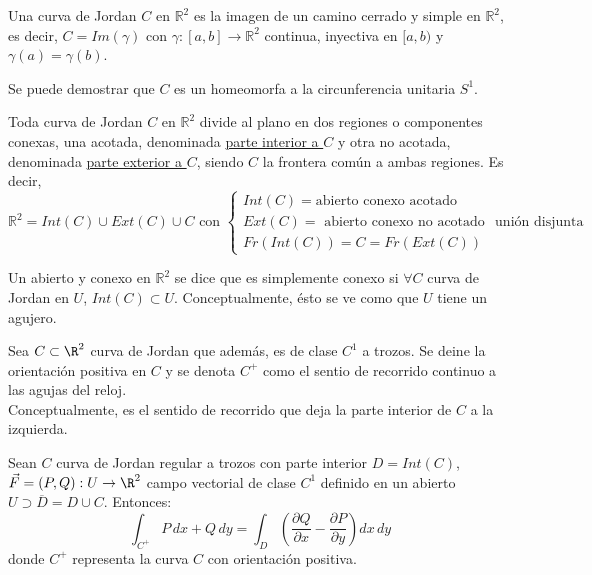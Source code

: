 \begin{definición}
Una curva de Jordan $C$ en $\mathbb{R}^2$ es la imagen de un camino cerrado y simple en $\mathbb{R}^2$, es decir, $C = Im(\gamma)$ con $\gamma: [a,b] \to \mathbb{R}^2$ continua, inyectiva en $[a, b)$ y $\gamma(a) = \gamma(b)$.
\end{definición}
\begin{observación}
Se puede demostrar que $C$ es un homeomorfa a la circunferencia unitaria $S^1$.
\end{observación}
\begin{teorema}
    Toda curva de Jordan $C$ en $\mathbb{R}^2$ divide al plano en dos regiones  o componentes conexas, una acotada, denominada \underline{parte interior a $C$} y otra no acotada, denominada \underline{parte exterior a $C$}, siendo $C$ la frontera común a ambas regiones. Es decir,
    $$\mathbb{R}^2 = Int(C) \cup Ext(C) \cup C \text{ con } \begin{cases}
            Int(C) = \text{abierto conexo acotado} \\ Ext(C) = \text{ abierto conexo no acotado} \\ Fr(Int(C)) = C = Fr(Ext(C))
        \end{cases} \text{ unión disjunta}$$
\end{teorema}
\begin{definición}
Un abierto y conexo en $\mathbb{R}^2$ se dice que es simplemente conexo si $\forall C$ curva de Jordan en $U$, $Int(C) \subset U$. Conceptualmente, ésto se ve como que $U$ tiene un agujero.
\end{definición}

\begin{definición}
Sea $C \subset \R^2$ curva de Jordan que además, es de clase $C^1$ a trozos. Se deine la orientación positiva en $C$ y se denota $C^+$ como el sentio de recorrido continuo a las agujas del reloj. \\
Conceptualmente, es el sentido de recorrido que deja la parte interior de $C$ a la izquierda.
\end{definición}

\begin{teorema}
    Sean $C$ curva de Jordan regular a trozos con parte interior $D = Int(C)$, $\vec{F} = (P, Q) : U \to \R^2$ campo vectorial de clase $C^1$ definido en un abierto $U \supset \overline{D} = D \cup C$. Entonces:
    $$\int_{C^+} P \, dx + Q \, dy = \int_{D} \left(\frac{\partial Q}{\partial x} - \frac{\partial P}{\partial y}\right) dx \, dy
    $$
    donde $C^+$ representa la curva $C$ con orientación positiva.
\end{teorema}

